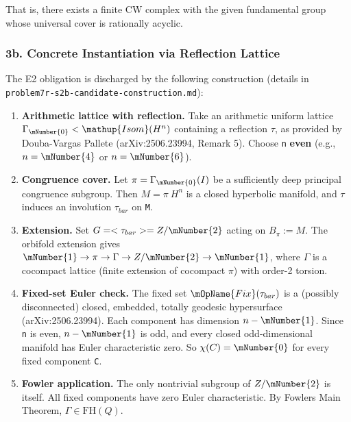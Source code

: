 That is, there exists a finite CW complex with the given fundamental group
whose universal cover is rationally acyclic.

\hypertarget{3b-concrete-instantiation-via-reflection-lattice}{%
\subsubsection{3b. Concrete Instantiation via Reflection Lattice}\label{3b-concrete-instantiation-via-reflection-lattice}}

The E2 obligation is discharged by the following construction (details in
\texttt{problem7r-s2b-candidate-construction.md}):

\begin{enumerate}
\def\labelenumi{\arabic{enumi}.}
\item
  \textbf{Arithmetic lattice with reflection.} Take an arithmetic uniform lattice
  \(\Gamma_\mNumber{0} < \mathup{Isom}(H^{n})\) containing a reflection \(\tau\), as provided by
  Douba-Vargas Pallete (arXiv:2506.23994, Remark 5). Choose \texttt{n} \textbf{even}
  (e.g., \(n = \mNumber{4}\) or \(n = \mNumber{6}\)).
\item
  \textbf{Congruence cover.} Let \(\pi = \Gamma_\mNumber{0}(I)\) be a sufficiently deep
  principal congruence subgroup. Then \(M = \pi \ H^{n}\) is a closed hyperbolic
  manifold, and \(\tau\) induces an involution \(\tau_{bar}\) on \texttt{M}.
\item
  \textbf{Extension.} Set \(G = <\tau_{bar}> = Z/\mNumber{2}\) acting on \(B_{\pi} := M\).
  The orbifold extension gives \(\mNumber{1} \to \pi \to \Gamma \to Z/\mNumber{2} \to \mNumber{1}\), where
  \(\Gamma\) is a cocompact lattice (finite extension of cocompact \(\pi\)) with
  order-2 torsion.
\item
  \textbf{Fixed-set Euler check.} The fixed set \(\mOpName{Fix}(\tau_{bar})\) is a (possibly
  disconnected) closed, embedded, totally geodesic hypersurface
  (arXiv:2506.23994). Each component has dimension \(n-\mNumber{1}\). Since \texttt{n} is even,
  \(n-\mNumber{1}\) is odd, and every closed odd-dimensional manifold has Euler
  characteristic zero. So \(\chi(C) = \mNumber{0}\) for every fixed component \texttt{C}.
\item
  \textbf{Fowler application.} The only nontrivial subgroup of \(Z/\mNumber{2}\) is itself.
  All fixed components have zero Euler characteristic. By Fowler\textquotesingle s Main
  Theorem, \(\Gamma \in \mathup{FH}(Q)\).
\end{enumerate}

